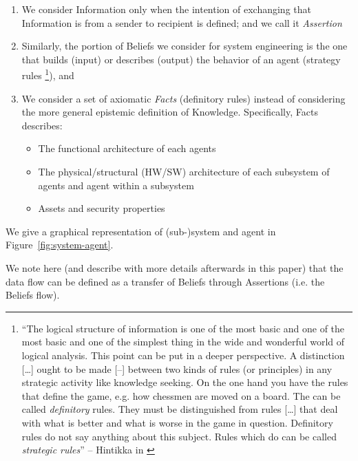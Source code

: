 \begin{enumerate}
	\item We consider Information only when the intention of exchanging 
		that Information is from a sender to 
		recipient is defined; and we call it \emph{Assertion}  
	\item Similarly, the portion of Beliefs we consider for system
		engineering is the one that builds (input) or describes
		(output) the behavior of an agent (strategy rules
		\footnote{``The logical structure of information is one of the
		most basic and one of the most basic and one of the simplest
		thing in the wide and wonderful world of logical analysis. This
		point can be put in a deeper perspective. A distinction
		[\ldots] ought to be made [--] between two kinds of rules (or
		principles) in any strategic activity like knowledge seeking.
		On the one hand you have the rules that define the game, e.g.
		how chessmen are moved on a board. The can be called
		\emph{definitory} rules.  They must be distinguished from rules
		[\ldots] that deal with what is better and what is worse in the
		game in question.  Definitory rules do not say anything about
		this subject. Rules which do can be called \emph{strategic
		rules}'' -- Hintikka in \autocite{Hintikka1993Information}}),
		and
	\item We consider a set of axiomatic \emph{Facts} (definitory rules) instead
		of considering the more general epistemic definition of
		Knowledge. Specifically, Facts describes:
		\begin{itemize}
			\item The functional architecture of each agents
			\item The physical/structural (HW/SW) architecture of each
				subsystem of agents and agent within a
				subsystem
			\item Assets and security properties
		\end{itemize}
\end{enumerate}
We give a graphical representation of (sub-)system and agent in Figure~\ref{fig:system-agent}.

We note here (and describe with more details afterwards in this paper) that the
data flow can be defined as a transfer of Beliefs through Assertions (i.e. the
Beliefs flow).

